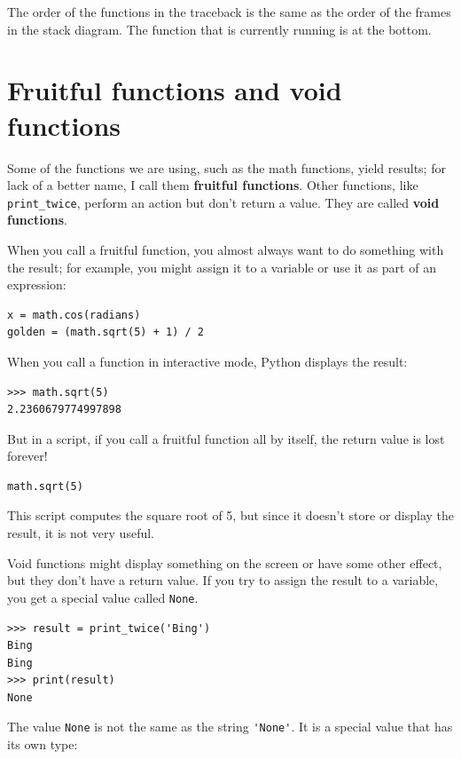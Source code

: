 \documentclass[10pt]{book}
\begin{document}

The order of the functions in the traceback is the same as the
order of the frames in the stack diagram.  The function that is
currently running is at the bottom.


\section{Fruitful functions and void functions}


Some of the functions we are using, such as the math functions, yield
results; for lack of a better name, I call them {\bf fruitful
  functions}.  Other functions, like \verb"print_twice", perform an
action but don't return a value.  They are called {\bf void
  functions}.

When you call a fruitful function, you almost always
want to do something with the result; for example, you might
assign it to a variable or use it as part of an expression:

\beforeverb
\begin{verbatim}
x = math.cos(radians)
golden = (math.sqrt(5) + 1) / 2
\end{verbatim}
\afterverb
%
When you call a function in interactive mode, Python displays
the result:

\beforeverb
\begin{verbatim}
>>> math.sqrt(5)
2.2360679774997898
\end{verbatim}
\afterverb
%
But in a script, if you call a fruitful function all by itself,
the return value is lost forever!

\beforeverb
\begin{verbatim}
math.sqrt(5)
\end{verbatim}
\afterverb
%
This script computes the square root of 5, but since it doesn't store
or display the result, it is not very useful.


Void functions might display something on the screen or have some
other effect, but they don't have a return value.  If you try to
assign the result to a variable, you get a special value called
{\tt None}.


\beforeverb
\begin{verbatim}
>>> result = print_twice('Bing')
Bing
Bing
>>> print(result)
None
\end{verbatim}
\afterverb
%
The value {\tt None} is not the same as the string \verb"'None'". 
It is a special value that has its own type:
\end{document}
